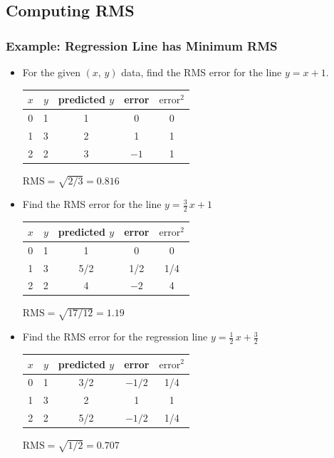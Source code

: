 \documentclass[t]{beamer}
\begin{document}
\subsection{Computing RMS}
\begin{frame}
\frametitle{Example:  Regression Line has Minimum RMS}
\newcommand{\Z}{\hphantom{0}}

\footnotesize 

\begin{itemize}
\item For the given $(x,\,y)$ data, find the RMS error for the line $y=x+1$.
\begin{center}
\begin{tabular}{cc|ccc}
$x$ & $y$ & predicted $y$ & error & $\mbox{error}^2$ \\\hline
0   & 1   & 1 & \Z0 & 0\\
1   & 3   & 2 & \Z1 & 1\\
2   & 2   & 3 & $-1$ & 1
\end{tabular}
{\color{blue}$\mbox{RMS} = \sqrt{2/3} = 0.816$}
\end{center}
%
\item<2-> Find the RMS error for the line $y=\frac{3}{2}\,x + 1$
\begin{center}
\begin{tabular}{cc|ccc}
$x$ & $y$ & predicted $y$ & error & $\mbox{error}^2$ \\\hline
0   & 1   & 1 & \Z0 & 0\\
1   & 3   & 5/2 & 1/2 & 1/4\\
2   & 2   & 4 & $-2$ & 4
\end{tabular}
{\color{blue}$\mbox{RMS} = \sqrt{17/12} = 1.19$}
\end{center}
\item<3-> Find the RMS error for the regression line $y=\frac{1}{2}\,x + \frac{3}{2}$
\begin{center}
\begin{tabular}{cc|ccc}
$x$ & $y$ & predicted $y$ & error & $\mbox{error}^2$ \\\hline
0   & 1   & 3/2 & $-1/2$ & 1/4\\
1   & 3   & 2   &  1 & 1\\
2   & 2   & 5/2 & $-1/2$ & 1/4
\end{tabular}
{\color{blue}$\mbox{RMS} = \sqrt{1/2} = 0.707$}
\end{center}
\end{itemize}

\end{frame}
\end{document}
